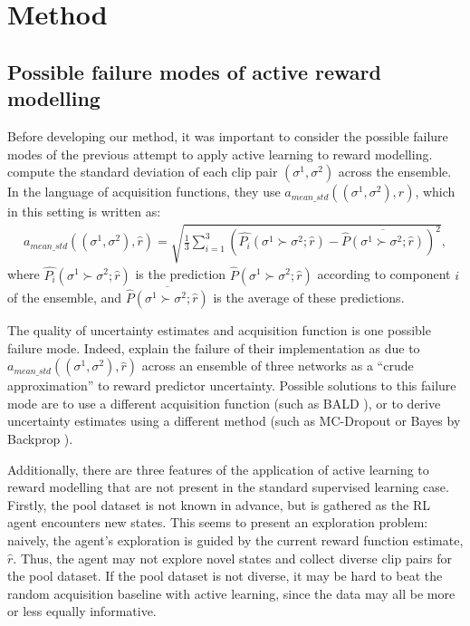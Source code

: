 \documentclass[11pt, a4paper, bibliography=totoc]{report}
\newcommand{\rp}{\hat{r}}
\begin{document}
\chapter{Method}

\section{Possible failure modes of active reward modelling}
Before developing our method, it was important to consider the possible failure modes of the previous attempt to apply active learning to reward modelling. \cite{Christiano2017} compute the standard deviation of each clip pair $(\sigma^1, \sigma^2)$ across the ensemble. In the language of acquisition functions, they use $ a_{mean\_std}((\sigma^1, \sigma^2), \rp) $, which in this setting is written as:
\begin{align*}
a_{mean\_std}((\sigma^1, \sigma^2), \rp) = \sqrt{\frac{1}{3}\sum_{i=1}^{3}\left(\hat{P_i}(\sigma^1 \succ \sigma^2  ; \rp) - \overline{\hat{P}(\sigma^1 \succ \sigma^2  ; \rp)}\right)^2},
\end{align*}
where $ \hat{P_i}(\sigma^1 \succ \sigma^2  ; \rp) $ is the prediction $ \hat{P}(\sigma^1 \succ \sigma^2  ; \rp) $ according to component $ i $ of the ensemble, and $ \overline{\hat{P}(\sigma^1 \succ \sigma^2  ; \rp)} $ is the average of these predictions.

The quality of uncertainty estimates and acquisition function is one possible failure mode. Indeed, \cite[p.~6]{Christiano2017} explain the failure of their implementation as due to $ a_{mean\_std}((\sigma^1, \sigma^2), \rp) $ across an ensemble of three networks as a ``crude approximation'' to reward predictor uncertainty. Possible solutions to this failure mode are to use a different acquisition function (such as BALD \cite{Houlsby2011}), or to derive uncertainty estimates using a different method (such as MC-Dropout \cite{Gal2015} or Bayes by Backprop \cite{Blundell2015}).

Additionally, there are three features of the application of active learning to reward modelling that are not present in the standard supervised learning case. Firstly, the pool dataset is not known in advance, but is gathered as the RL agent encounters new states. This seems to present an exploration problem: naively, the agent's exploration is guided by the current reward function estimate, $ \rp $. Thus, the agent may not explore novel states and collect diverse clip pairs for the pool dataset. If the pool dataset is not diverse, it may be hard to beat the random acquisition baseline with active learning, since the data may all be more or less equally informative.
\end{document}
